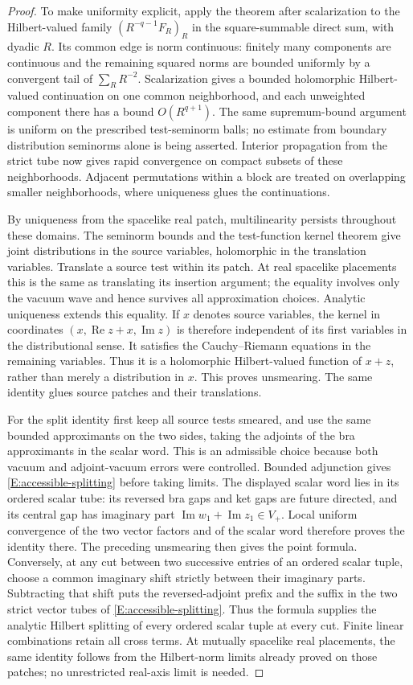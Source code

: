\begin{proof}
To make uniformity explicit, apply the theorem after scalarization
to the Hilbert-valued family $(R^{-q-1}F_R)_R$ in the
square-summable direct sum, with dyadic $R$.  Its common edge is
norm continuous: finitely many components are continuous and the
remaining squared norms are bounded uniformly by a convergent tail
of $\sum_R R^{-2}$.  Scalarization gives a bounded holomorphic
Hilbert-valued continuation on one common neighborhood, and each
unweighted component there has a bound $O(R^{q+1})$.  The same
supremum-bound argument is uniform on the prescribed test-seminorm
balls; no estimate from boundary distribution seminorms alone is
being asserted.  Interior
propagation from the strict tube now gives rapid convergence on
compact subsets of these neighborhoods.  Adjacent permutations
within a block are treated on overlapping smaller neighborhoods,
where uniqueness glues the continuations.

By uniqueness from the spacelike real patch, multilinearity persists
throughout these domains.  The seminorm bounds and the test-function
kernel theorem give joint distributions in the source variables,
holomorphic in the translation variables.  Translate a source test
within its patch.  At real spacelike placements this is the same as
translating its insertion argument; the equality involves only the
vacuum wave and hence survives all approximation choices.  Analytic
uniqueness extends this equality.  If $x$ denotes source variables,
the kernel in coordinates
$(x,\operatorname{Re}z+x,\operatorname{Im}z)$ is therefore independent
of its first variables in the distributional sense.  It satisfies
the Cauchy--Riemann equations in the remaining variables.  Thus it is
a holomorphic Hilbert-valued function of $x+z$, rather than merely a
distribution in $x$.  This proves unsmearing.  The same identity glues
source patches and their translations.

For the split identity first keep all source tests smeared, and use
the same bounded approximants on the two sides, taking the adjoints of
the bra approximants in the scalar word.  This is an admissible choice
because both vacuum and adjoint-vacuum errors were controlled.  Bounded
adjunction gives \eqref{E:accessible-splitting} before taking limits.
The displayed scalar word lies in its ordered scalar tube: its reversed
bra gaps and ket gaps are future directed, and its central gap has
imaginary part $\operatorname{Im}w_1+\operatorname{Im}z_1\in V_+$.
Local uniform convergence of the two vector factors and of the scalar
word therefore proves the identity there.  The preceding unsmearing
then gives the point formula.  Conversely, at any cut between two
successive entries of an ordered scalar tuple, choose a common
imaginary shift strictly between their imaginary parts.  Subtracting
that shift puts the reversed-adjoint prefix and the suffix in the two
strict vector tubes of \eqref{E:accessible-splitting}.  Thus the formula
supplies the analytic Hilbert splitting of every ordered scalar tuple
at every cut.  Finite linear combinations retain all
cross terms.  At mutually spacelike real placements, the same identity
follows from the Hilbert-norm limits already proved on those patches;
no unrestricted real-axis limit is needed.


\end{proof}
